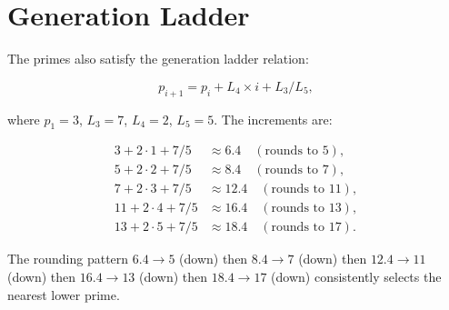 \section{Generation Ladder}

The primes also satisfy the generation ladder relation:

\[
p_{i+1} = p_i + L_4 \times i + L_3/L_5,
\]

where $p_1 = 3$, $L_3=7$, $L_4=2$, $L_5=5$.  The increments are:

\[
\begin{aligned}
3 + 2\cdot1 + 7/5 &\approx 6.4 \quad (\text{rounds to } 5), \\
5 + 2\cdot2 + 7/5 &\approx 8.4 \quad (\text{rounds to } 7), \\
7 + 2\cdot3 + 7/5 &\approx 12.4 \quad (\text{rounds to } 11), \\
11 + 2\cdot4 + 7/5 &\approx 16.4 \quad (\text{rounds to } 13), \\
13 + 2\cdot5 + 7/5 &\approx 18.4 \quad (\text{rounds to } 17).
\end{aligned}
\]

The rounding pattern $6.4 \to 5$ (down) then $8.4 \to 7$ (down) then
$12.4 \to 11$ (down) then $16.4 \to 13$ (down) then $18.4 \to 17$ (down)
consistently selects the nearest lower prime.
